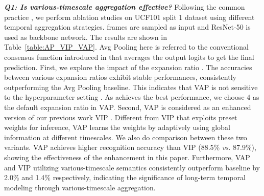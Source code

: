 \documentclass[journal]{IEEEtran}
\begin{document}
\textbf{\emph{Q1: Is various-timescale aggregation effective? }} Following the common practice \cite{wang2016temporal,feichtenhofer2016convolutional,tran2017convnet}, we perform ablation studies on UCF101 split 1 dataset using different temporal aggregation strategies.  frames are sampled as input and ResNet-50 is used as backbone network. The results are shown in Table~\ref{table:AP_VIP_VAP}. Avg Pooling here is referred to the conventional consensus function introduced in \cite{wang2016temporal} that averages the output logits to get the final prediction. First, we explore the impact of the expansion ratio . The accuracies between various expansion ratios exhibit stable performances, consistently outperforming the Avg Pooling baseline. This indicates that VAP is not sensitive to the hyperparameter setting . As  achieves the best performance, we choose 4 as the default expansion ratio in VAP. Second, VAP is considered as an enhanced version of our previous work VIP \cite{Zhang2019PANPA}. Different from VIP that exploits preset weights for inference, VAP learns the weights by adaptively using global information at different timescales. We also do comparison between these two variants. VAP achieves higher recognition accuracy than VIP (88.5\% \emph{vs.} 87.9\%), showing the effectiveness of the enhancement in this paper. Furthermore, VAP and VIP utilizing various-timescale semantics consistently outperform baseline by 2.0\% and 1.4\% respectively, indicating the significance of long-term temporal modeling through various-timescale aggregation.
\end{document}
